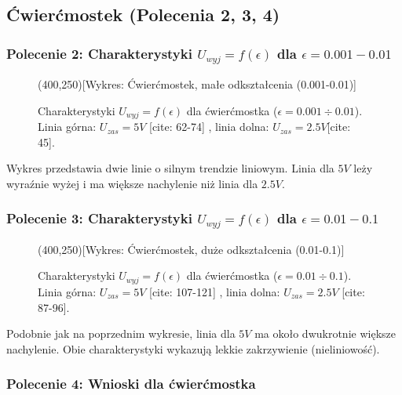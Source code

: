 \documentclass[12pt, a4paper]{article}
\begin{document}
	\subsection{Ćwierćmostek (Polecenia 2, 3, 4)}
	
	\subsubsection*{Polecenie 2: Charakterystyki $U_{wyj} = f(\epsilon)$ dla $\epsilon = 0.001-0.01$}
	
	\begin{figure}[H]
		\centering
		\framebox(400,250){[Wykres: Ćwierćmostek, małe odkształcenia (0.001-0.01)]}
		\caption{Charakterystyki $U_{wyj} = f(\epsilon)$ dla ćwierćmostka ($\epsilon = 0.001 \div 0.01$).  Linia górna: $U_{zas} = 5 V$ [cite: 62-74] , linia dolna: $U_{zas} = 2.5 V$[cite: 45].}
	\end{figure}
	
	Wykres przedstawia dwie linie o silnym trendzie liniowym. Linia dla $5 V$ leży wyraźnie wyżej i ma większe nachylenie niż linia dla $2.5 V$.
	
	\subsubsection*{Polecenie 3: Charakterystyki $U_{wyj} = f(\epsilon)$ dla $\epsilon = 0.01-0.1$}
	
	\begin{figure}[H]
		\centering
		\framebox(400,250){[Wykres: Ćwierćmostek, duże odkształcenia (0.01-0.1)]}
		\caption{Charakterystyki $U_{wyj} = f(\epsilon)$ dla ćwierćmostka ($\epsilon = 0.01 \div 0.1$).  Linia górna: $U_{zas} = 5 V$ [cite: 107-121] , linia dolna: $U_{zas} = 2.5 V$ [cite: 87-96].}
	\end{figure}
	
	Podobnie jak na poprzednim wykresie, linia dla $5 V$ ma około dwukrotnie większe nachylenie. Obie charakterystyki wykazują lekkie zakrzywienie (nieliniowość).
	
	\subsubsection*{Polecenie 4: Wnioski dla ćwierćmostka}
	
\end{document}

